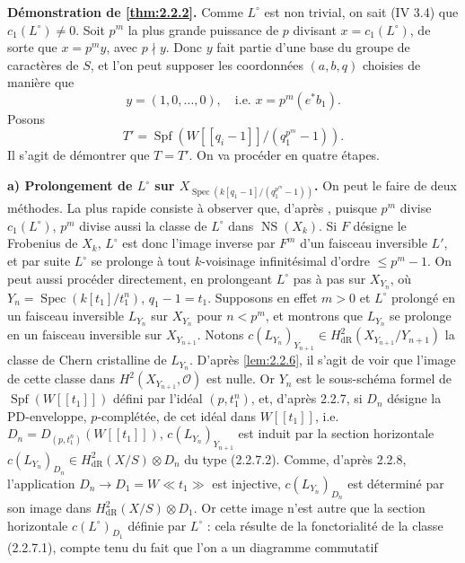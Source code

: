 \documentclass[12pt,a4paper]{article}
\theoremstyle{plain}
\theoremstyle{definition}
\theoremstyle{remark}
\DeclareMathOperator{\Spec}{Spec}
\DeclareMathOperator{\Spf}{Spf}
\providecommand{\Spec}{\operatorname{Spec}}
\providecommand{\NS}{\operatorname{NS}}
\begin{document}
\subsubsection{}
\textbf{D\'emonstration de \ref{thm:2.2.2}.} Comme $L^\circ$ est non trivial, on sait (IV 3.4) que $c_1(L^\circ) \neq 0$. Soit $p^m$ la plus grande puissance de $p$ divisant $x = c_1(L^\circ)$, de sorte que $x = p^m y$, avec $p \nmid y$. Donc $y$ fait partie d'une base du groupe de caract\`eres de $S$, et l'on peut supposer les coordonn\'ees $(a, b, q)$ choisies de mani\`ere que
\[
y = (1, 0, \ldots, 0), \quad \text{i.e. } x = p^m (e^* b_1).
\]
Posons
\[
T' = \Spf(W[[q_i - 1]]/(q_1^{p^m} - 1)).
\]
Il s'agit de d\'emontrer que $T = T'$. On va proc\'eder en quatre \'etapes.

\textbf{a) Prolongement de $L^\circ$ sur $X_{\Spec(k[q_1-1]/(q_1^{p^m}-1))}$.} On peut le faire de deux m\'ethodes. La plus rapide consiste \`a observer que, d'apr\`es \cite[1.4]{Ogus1979}, puisque $p^m$ divise $c_1(L^\circ)$, $p^m$ divise aussi la classe de $L^\circ$ dans $\NS(X_k)$. Si $F$ d\'esigne le Frobenius de $X_k$, $L^\circ$ est donc l'image inverse par $F^m$ d'un faisceau inversible $L'$, et par suite $L^\circ$ se prolonge \`a tout $k$-voisinage infinit\'esimal d'ordre $\leqslant p^m - 1$. On peut aussi proc\'eder directement, en prolongeant $L^\circ$ pas \`a pas sur $X_{Y_n}$, o\`u $Y_n = \Spec(k[t_1]/t_1^n)$, $q_1 - 1 = t_1$. Supposons en effet $m > 0$ et $L^\circ$ prolong\'e en un faisceau inversible $L_{Y_n}$ sur $X_{Y_n}$ pour $n < p^m$, et montrons que $L_{Y_n}$ se prolonge en un faisceau inversible sur $X_{Y_{n+1}}$. Notons $c(L_{Y_n})_{Y_{n+1}} \in H^2_\mathrm{dR}(X_{Y_{n+1}}/Y_{n+1})$ la classe de Chern cristalline de $L_{Y_n}$. D'apr\`es \ref{lem:2.2.6}, il s'agit de voir que l'image de cette classe dans $H^2(X_{Y_{n+1}}, \mathcal{O})$ est nulle. Or $Y_n$ est le sous-sch\'ema formel de $\Spf(W[[t_1]])$ d\'efini par l'id\'eal $(p, t_1^n)$, et, d'apr\`es 2.2.7, si $D_n$ d\'esigne la PD-enveloppe, $p$-compl\'et\'ee, de cet id\'eal dans $W[[t_1]]$, i.e. $D_n = D_{(p, t_1^n)}(W[[t_1]])$, $c(L_{Y_n})_{Y_{n+1}}$ est induit par la section horizontale $c(L_{Y_n})_{D_n} \in H^2_\mathrm{dR}(X/S) \otimes D_n$ du type (2.2.7.2). Comme, d'apr\`es 2.2.8, l'application $D_n \to D_1 = W\ll t_1 \gg$ est injective, $c(L_{Y_n})_{D_n}$ est d\'etermin\'e par son image dans $H^2_\mathrm{dR}(X/S) \otimes D_1$. Or cette image n'est autre que la section horizontale $c(L^\circ)_{D_1}$ d\'efinie par $L^\circ$ : cela r\'esulte de la fonctorialit\'e de la classe (2.2.7.1), compte tenu du fait que l'on a un diagramme commutatif
\end{document}

